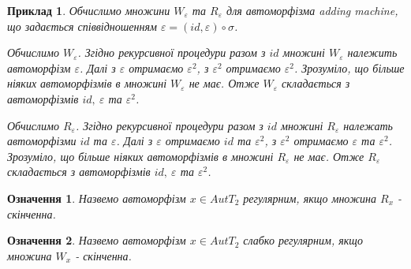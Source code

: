 \documentclass[a4paper,12pt]{article} \usepackage{a4wide}
\numberwithin{equation}{subsection}
\newtheorem{definition}{Означення}[subsection]
\newtheorem{example}{Приклад}[subsection]
\begin{document}
 \begin{example} \label{exeps} Обчислимо множини $W_{\varepsilon}$ та
   $R_{\varepsilon}$ для автоморфізма adding machine, що задається
   співвідношенням $\varepsilon=(id,\varepsilon)\circ \sigma$.

   Обчислимо $W_{\varepsilon}$.  Згідно рекурсивної процедури разом з
   $id$ множині $W_{\varepsilon}$ належить автоморфізм
   $\varepsilon$. Далі з $\varepsilon$ отримаємо $\varepsilon^2$, з
   $\varepsilon^2$ отримаємо $\varepsilon^2$. Зрозуміло, що більше
   ніяких автоморфізмів в множині $W_{\varepsilon}$ не має. Отже
   $W_{\varepsilon}$ складається з автоморфізмів $id,\ \varepsilon$ та
   $\varepsilon^2$.

   Обчислимо $R_{\varepsilon}$.  Згідно рекурсивної процедури разом з
   $id$ множині $R_{\varepsilon}$ належать автоморфізми $id$ та
   $\varepsilon$. Далі з $\varepsilon$ отримаємо $id$ та
   $\varepsilon^2$, з $\varepsilon^2$ отримаємо $\varepsilon$ та
   $\varepsilon^2$. Зрозуміло, що більше ніяких автоморфізмів в
   множині $R_{\varepsilon}$ не має. Отже $R_{\varepsilon}$
   складається з автоморфізмів $id,\ \varepsilon$ та $\varepsilon^2$.

 \end{example}
 \begin{definition}
   Назвемо автоморфізм $x \in AutT_2$ регулярним, якщо множина $R_x$ -
   скінченна.
 \end{definition}

 \begin{definition}
   Назвемо автоморфізм $x \in AutT_2$ слабко регулярним, якщо множина
   $W_x$ - скінченна.
 \end{definition}
\end{document}
